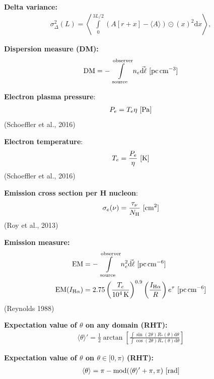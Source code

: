\documentclass[a4paper,10pt]{article}
\begin{document}
{\noindent}\textbf{Delta variance:}
\begin{align*}
    \sigma_\Delta^2(L) = \left\langle \int\limits_0^{3L/2} {(A[r+x]-\langle A\rangle)\odot(x)}^2\mathrm{d}x \right\rangle,
\end{align*}

{\noindent}\textbf{Dispersion measure (DM):}
\begin{align*}
    {\rm DM} = -\int\limits_\mathrm{source}^\mathrm{observer} n_e\vec{{\rm d}\ell} ~ [{\rm pc\,cm^{-3}}]
\end{align*}

{\noindent}\textbf{Electron plasma pressure}:
\begin{align*}
    P_e = T_e \eta ~ [{\rm Pa}]
\end{align*}
(Schoeffler et al., 2016)

{\noindent}\textbf{Electron temperature}:
\begin{align*}
    T_e = \frac{P_e}{\eta} ~ [{\rm K}]
\end{align*}
(Schoeffler et al., 2016)

{\noindent}\textbf{Emission cross section per H nucleon}:
\begin{align*}
    \sigma_e(\nu) = \frac{\tau_\nu}{N_{\rm H}} ~ [{\rm cm^2}]
\end{align*}
(Roy et al., 2013)

{\noindent}\textbf{Emission measure:}
\begin{align*}
    {\rm EM} &= -\int\limits_\mathrm{source}^\mathrm{observer} n_e^2\vec{{\rm d}\ell} ~ [{\rm pc\,cm^{-6}}] \\
    {\rm EM}(I_{\rm H\alpha}) &= 2.75 \left(\frac{T_e}{10^4\,{\rm K}}\right)^{0.9} \left(\frac{I_{\rm H\alpha}}{R}\right) e^\tau ~ [{\rm pc\,cm^{-6}}]
\end{align*}
(Reynolds 1988)

{\noindent}\textbf{Expectation value of $\theta$ on any domain (RHT):}
\begin{align*}
    \langle\theta\rangle' = \frac{1}{2}\arctan \left[\frac{\int\sin(2\theta)R_*(\theta)\mathrm{d}\theta}{\int\cos(2\theta)R_*(\theta)\mathrm{d}\theta}\right]
\end{align*}

{\noindent}\textbf{Expectation value of $\theta$ on $\theta\in[0,\pi)$ (RHT):}
\begin{align*}
    \langle\theta\rangle = \pi - {\rm mod}(\langle\theta\rangle'+\pi,\pi) ~ [{\rm rad}]
\end{align*}
\end{document}
